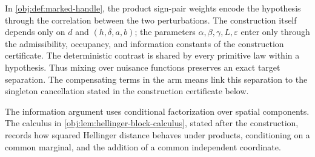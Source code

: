 In \cref{obj:def:marked-handle}, the product sign-pair weights  encode the hypothesis through the correlation between the two perturbations. The construction itself depends only on \(d\) and \((h,\delta,a,b)\); the parameters \(\alpha,\beta,\gamma,L,\varepsilon\) enter only through the admissibility, occupancy, and information constants of the construction certificate. The deterministic contrast  is shared by every primitive law within a hypothesis. Thus mixing over nuisance functions preserves an exact target separation. The compensating terms in the arm means link this separation to the singleton cancellation stated in the construction certificate below.

The information argument uses conditional factorization over spatial components. The calculus in \cref{obj:lem:hellinger-block-calculus}, stated after the construction, records how squared Hellinger distance behaves under products, conditioning on a common marginal, and the addition of a common independent coordinate.

